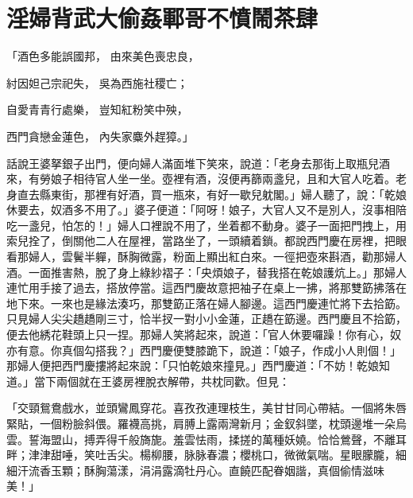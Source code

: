 %

\chapter{淫婦背武大偷姦\KG 鄆哥不憤鬧茶肆}

\begin{showcontents}{}



「酒色多能誤國邦，  由來美色喪忠良，

紂因妲己宗祀失，  吳為西施社稷亡；

自愛青青行處樂，  豈知紅粉笑中殃，

西門貪戀金蓮色，  內失家麋外趕獐。」

話說王婆拏銀子出門，便向婦人滿面堆下笑來，說道：「老身去那街上取瓶兒酒來，有勞娘子相待官人坐一坐。壺裡有酒，沒便再篩兩盞兒，且和大官人吃着。老身直去縣東街，那裡有好酒，買一瓶來，有好一歇兒躭閣。」婦人聽了，說：「乾娘休要去，奴酒多不用了。」婆子便道：「阿呀！娘子，大官人又不是別人，沒事相陪吃一盞兒，怕怎的！」婦人口裡說不用了，坐着都不動身。婆子一面把門拽上，用索兒拴了，倒關他二人在屋裡，當路坐了，一頭續着鎖。都說西門慶在房裡，把眼看那婦人，雲鬢半軃，酥胸微露，粉面上顯出紅白來。一徑把壺來斟酒，勸那婦人酒。一面推害熱，脫了身上綠紗褶子：「央煩娘子，替我搭在乾娘護炕上。」那婦人連忙用手接了過去，搭放停當。這西門慶故意把袖子在桌上一拂，將那雙筯拂落在地下來。一來也是緣法湊巧，那雙筯正落在婦人腳邊。這西門慶連忙將下去拾筯。只見婦人尖尖趫趫剛三寸，恰半扠一對小小金蓮，正趫在筯邊。西門慶且不拾筯，便去他綉花鞋頭上只一捏。那婦人笑將起來，說道：「官人休要囉躁！你有心，奴亦有意。你真個勾搭我？」西門慶便雙膝跪下，說道：「娘子，作成小人則個！」那婦人便把西門慶摟將起來說：「只怕乾娘來撞見。」西門慶道：「不妨！乾娘知道。」當下兩個就在王婆房裡脫衣解帶，共枕同歡。但見：

「交頸鴛鴦戲水，並頭鸞鳳穿花。喜孜孜連理枝生，美甘甘同心帶結。一個將朱唇緊貼，一個粉臉斜偎。羅襪高挑，肩膊上露兩灣新月；金釵斜墜，枕頭邊堆一朵烏雲。誓海盟山，搏弄得千般旖旎。羞雲怯雨，揉搓的萬種妖嬈。恰恰鶯聲，不離耳畔；津津甜唾，笑吐舌尖。楊柳腰，脉脉春濃；櫻桃口，微微氣喘。星眼朦朧，細細汗流香玉顆；酥胸蕩漾，涓涓露滴牡丹心。直饒匹配眷姻諧，真個偷情滋味美！」


\end{showcontents}
